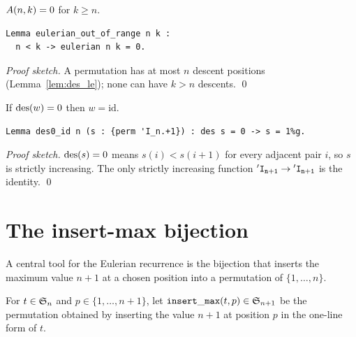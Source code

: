 \begin{lemma}
  \label{lem:eulerian_out_of_range}
  $A(n, k) = 0$ for $k \geq n$.
\end{lemma}

\begin{lstlisting}[language=Rocq]
Lemma eulerian_out_of_range n k :
  n < k -> eulerian n k = 0.
\end{lstlisting}


\noindent
\emph{Proof sketch.} A permutation has at most $n$ descent positions
(Lemma~\ref{lem:des_le}); none can have $k > n$ descents. \qed

\begin{lemma}
  \label{lem:des0_id}
  If $\mathrm{des}(w) = 0$ then $w = \mathrm{id}$.
\end{lemma}

\begin{lstlisting}[language=Rocq]
Lemma des0_id n (s : {perm 'I_n.+1}) : des s = 0 -> s = 1%g.
\end{lstlisting}


\noindent
\emph{Proof sketch.} $\mathrm{des}(s) = 0$ means $s(i) < s(i+1)$ for every
adjacent pair $i$, so $s$ is strictly increasing. The only strictly
increasing function $\mathtt{'I_{n+1}} \to \mathtt{'I_{n+1}}$ is the identity. \qed

\section{The insert-max bijection}
\label{sec:insert_max}

A central tool for the Eulerian recurrence is the bijection that
inserts the maximum value $n+1$ at a chosen position into a
permutation of $\{1, \dots, n\}$.

\begin{definition}
  \label{def:insert_max}
  For $t \in \mathfrak{S}_{n}$ and $p \in \{1, \dots, n+1\}$, let
  $\mathtt{insert\_max}(t, p) \in \mathfrak{S}_{n+1}$ be the permutation
  obtained by inserting the value $n+1$ at position $p$ in the
  one-line form of $t$.
\end{definition}

